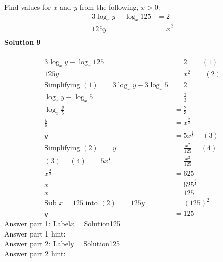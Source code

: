 \documentclass{article}
\begin{document}
Find values for $x$ and $y$ from the following, $x>0$:
\begin{align*}
3\log_{x}y-\log_{x}125&=2\\[2pt]
125y&=x^2\\[-22pt]
\end{align*}
\noindent\textbf{Solution 9}\\[2pt]
\\[-35pt]\begin{align*}
3\log_{x}y-\log_{x}125&=2\hspace{25pt} (1)\\[2pt]
125y&=x^2\qquad (2)\\[2pt]
\text{Simplifying} \,\, (1)\qquad 3\log_{x}y-3\log_{x}5&=2\\[2pt]
\log_{x}y-\log_{x}5&=\displaystyle\frac{2}{3}\\[2pt]
\log_{x}\displaystyle\frac{y}{5}&=\displaystyle\frac{2}{3}\\[2pt]
\displaystyle\frac{y}{5}&=x^{\displaystyle\frac{2}{3}}\\[2pt]
y&=5x^{\displaystyle\frac{2}{3}}\hspace{14pt}(3)\\[2pt]
\text{Simplifying}\,\,(2)\qquad y&=\displaystyle\frac{x^2}{125}\hspace{15pt}(4)\\[2pt]
(3) = (4)\qquad 5x^{\displaystyle\frac{2}{3}}&=\displaystyle\frac{x^2}{125}\\[2pt]
x^{\displaystyle\frac{4}{3}}&=625\\[2pt]
x&=625^{\displaystyle\frac{3}{4}}\\[2pt]
x&=125\\[12pt]
\text{Sub}\,\,x=125\,\,\text{into}\,\,(2)\qquad 125y&=(125)^2\\[2pt]
y&=125
\end{align*}
Answer part 1: \hspace{10pt}Label\hspace{10pt}$x=$\hspace{10pt}Solution\hspace{10pt}125\\
Answer part 1 hint: \hspace{15pt}\\
Answer part 2: \hspace{10pt}Label\hspace{10pt}$y=$\hspace{10pt}Solution\hspace{10pt}125\\
Answer part 2 hint: \hspace{15pt}\\
\end{document}
